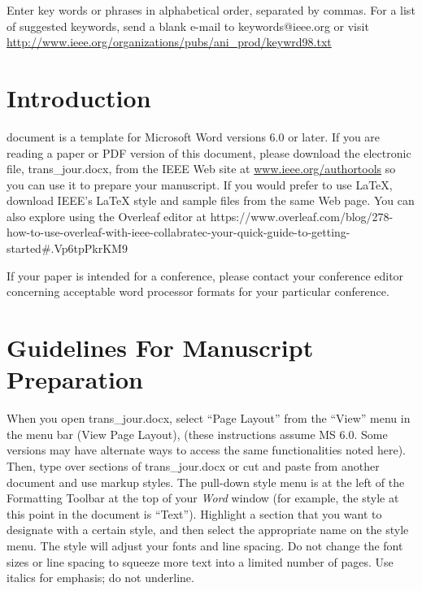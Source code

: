 \documentclass[journal]{IEEEtran}
\begin{document}
\begin{IEEEkeywords}
Enter key words or phrases in alphabetical order, separated by commas. For a list of suggested keywords, send a blank e-mail to keywords@ieee.org or visit \url{http://www.ieee.org/organizations/pubs/ani_prod/keywrd98.txt}
\end{IEEEkeywords}


\IEEEpeerreviewmaketitle



\section{Introduction}

 document is a template for Microsoft Word versions 6.0 or later. If you are reading a paper or PDF version of this document, please download the electronic file, trans\_jour.docx, from the IEEE Web site at \url{www.ieee.org/authortools} so you can use it to prepare your manuscript. If you would prefer to use LaTeX, download IEEE's LaTeX style and sample files from the same Web page. You can also explore using the Overleaf editor at {https://www.overleaf.com/blog/278-how-to-use-overleaf-with-ieee-collabratec-your-quick-guide-to-getting-started\#.Vp6tpPkrKM9}

If your paper is intended for a conference, please contact your conference editor concerning acceptable word processor formats for your particular conference.  


\section{Guidelines For Manuscript Preparation}

When you open trans\_jour.docx, select ``Page Layout'' from the ``View'' menu in the menu bar (View Page Layout), (these instructions assume MS 6.0. Some versions may have alternate ways to access the same functionalities noted here). Then, type over sections of trans\_jour.docx or cut and paste from another document and use markup styles. The pull-down style menu is at the left of the Formatting Toolbar at the top of your {\em Word} window (for example, the style at this point in the document is ``Text''). Highlight a section that you want to designate with a certain style, and then select the appropriate name on the style menu. The style will adjust your fonts and line spacing. Do not change the font sizes or line spacing to squeeze more text into a limited number of pages. Use italics for emphasis; do not underline. 
\end{document}
